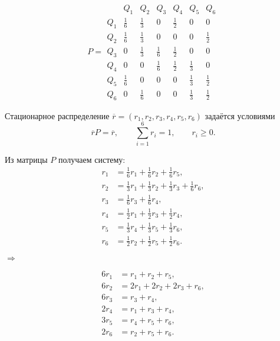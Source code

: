 \[
	P =
	\begin{array}{c|cccccc}
		    & Q_1          & Q_2          & Q_3          & Q_4          & Q_5          & Q_6          \\
		\hline
		Q_1 & \tfrac{1}{6} & \tfrac{1}{3} & 0            & \tfrac{1}{2} & 0            & 0            \\
		Q_2 & \tfrac{1}{6} & \tfrac{1}{3} & 0            & 0            & 0            & \tfrac{1}{2} \\
		Q_3 & 0            & \tfrac{1}{3} & \tfrac{1}{6} & \tfrac{1}{2} & 0            & 0            \\
		Q_4 & 0            & 0            & \tfrac{1}{6} & \tfrac{1}{2} & \tfrac{1}{3} & 0            \\
		Q_5 & \tfrac{1}{6} & 0            & 0            & 0            & \tfrac{1}{3} & \tfrac{1}{2} \\
		Q_6 & 0            & \tfrac{1}{6} & 0            & 0            & \tfrac{1}{3} & \tfrac{1}{2}
	\end{array}
\]


Стационарное распределение $\overline r=(r_1,r_2,r_3,r_4,r_5,r_6)$
задаётся условиями
\[
	\overline r P = \overline r,
	\qquad \sum_{i=1}^6 r_i = 1,
	\qquad r_i \ge 0.
\]

Из матрицы $P$ получаем систему:
\[
	\begin{aligned}
		r_1 & = \tfrac{1}{6}r_1 + \tfrac{1}{6}r_2 + \tfrac{1}{6}r_5,                   \\
		r_2 & = \tfrac{1}{3}r_1 + \tfrac{1}{3}r_2 + \tfrac{1}{3}r_3 + \tfrac{1}{6}r_6, \\
		r_3 & = \tfrac{1}{6}r_3 + \tfrac{1}{6}r_4,                                     \\
		r_4 & = \tfrac{1}{2}r_1 + \tfrac{1}{2}r_3 + \tfrac{1}{2}r_4,                   \\
		r_5 & = \tfrac{1}{3}r_4 + \tfrac{1}{3}r_5 + \tfrac{1}{3}r_6,                   \\
		r_6 & = \tfrac{1}{2}r_2 + \tfrac{1}{2}r_5 + \tfrac{1}{2}r_6.
	\end{aligned}
\]

$\Rightarrow$

\[
	\begin{aligned}
		6r_1 & = r_1 + r_2 + r_5,          \\
		6r_2 & = 2r_1 + 2r_2 + 2r_3 + r_6, \\
		6r_3 & = r_3 + r_4,                \\
		2r_4 & = r_1 + r_3 + r_4,          \\
		3r_5 & = r_4 + r_5 + r_6,          \\
		2r_6 & = r_2 + r_5 + r_6.
	\end{aligned}
\]

